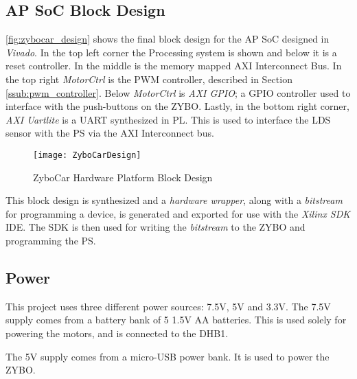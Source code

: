 \documentclass[Main]{subfiles}
\begin{document}
			\newpage
			

		

	\subsection{AP SoC Block Design} %
	\label{sub:ap_soc_block_design}

		\autoref{fig:zybocar_design} shows the final block design for the AP SoC designed in \emph{Vivado}.
		In the top left corner the Processing system is shown and below it is a reset controller. 
		In the middle is the memory mapped AXI Interconnect Bus.
		In the top right \emph{MotorCtrl} is the PWM controller, described in Section \ref{ssub:pwm_controller}.
		Below \emph{MotorCtrl} is \emph{AXI GPIO}; a GPIO controller used to interface with the push-buttons on the ZYBO.
		Lastly, in the bottom right corner, \emph{AXI Uartlite} is a UART synthesized in PL.
		This is used to interface the LDS sensor with the PS via the AXI Interconnect bus.

		\begin{figure}[H]
			\centering
			\texttt{[image: ZyboCarDesign]}
			\caption{ZyboCar Hardware Platform Block Design}
			\label{fig:zybocar_design}
		\end{figure}

		This block design is synthesized and a \emph{hardware wrapper}, along with a \emph{bitstream} for programming a device, is generated and exported for use with the \emph{Xilinx SDK} IDE.
		The SDK is then used for writing the \emph{bitstream} to the ZYBO and programming the PS. 


	\subsection{Power} %
	\label{sub:power}

		This project uses three different power sources: 7.5V, 5V and 3.3V.
		The 7.5V supply comes from a battery bank of 5 1.5V AA batteries.
		This is used solely for powering the motors, and is connected to the DHB1.

		The 5V supply comes from a micro-USB power bank. 
		It is used to power the ZYBO.
\end{document}
